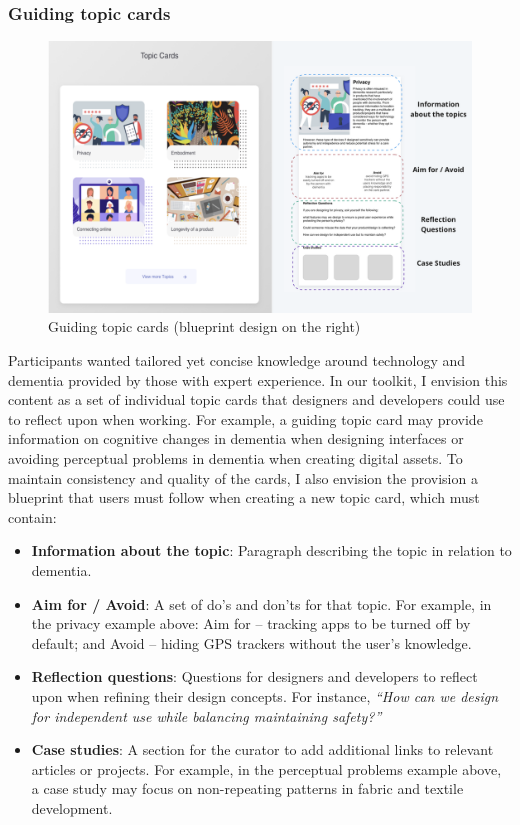 \subsubsection{Guiding topic cards}
\begin{figure}[h]
\centering
\includegraphics[width=1\linewidth]{Images/D3Toolkit/Fig9.png}
\caption{Guiding topic cards (blueprint design on the right)}
\label{fig:topicCards}
\end{figure}
Participants wanted tailored yet concise knowledge around technology and dementia provided by those with expert experience. In our toolkit, I envision this content as a set of individual topic cards that designers and developers could use to reflect upon when working. For example, a guiding topic card may provide information on cognitive changes in dementia when designing interfaces or avoiding perceptual problems in dementia when creating digital assets. To maintain consistency and quality of the cards, I also envision the provision a blueprint that users must follow when creating a new topic card, which must contain:
\begin{itemize}
    \item \textbf{Information about the topic}: Paragraph describing the topic in relation to dementia.
    \item \textbf{Aim for / Avoid}: A set of do's and don'ts for that topic. For example, in the privacy example above: Aim for – tracking apps to be turned off by default; and Avoid – hiding GPS trackers without the user’s knowledge. 
    \item \textbf{Reflection questions}: Questions for designers and developers to reflect upon when refining their design concepts. For instance,\textit{ ``How can we design for independent use while balancing maintaining safety?''}
    \item \textbf{Case studies}: A section for the curator to add additional links to relevant articles or projects. For example, in the perceptual problems example above, a case study may focus on non-repeating patterns in fabric and textile development.
\end{itemize}

